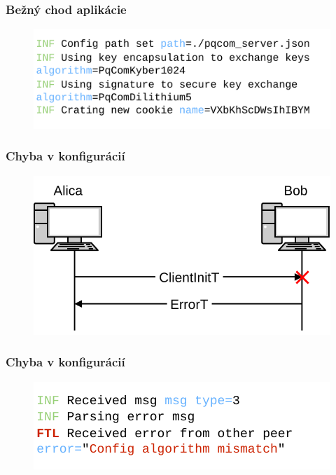 \documentclass[%
  14pt,       				%
	t,                  %
	aspectratio=1610,   %
	unicode,						%
]{beamer}				    	%
\begin{document}
\begin{frame}[c]
	\frametitle{Bežný chod aplikácie}
	\begin{figure}
		\includegraphics[width=\textwidth]{presentation_pictures/normal_comm.pdf}
	\end{figure}
\end{frame}

\begin{frame}[c]
	\frametitle{Chyba v konfigurácií}
	\begin{figure}
		\includegraphics[width=.9\textwidth]{presentation_pictures/comm_err.pdf}
	\end{figure}
\end{frame}

\begin{frame}[c]
	\frametitle{Chyba v konfigurácií}
	\begin{figure}[htbp]
		\centering
		\includegraphics[width=\textwidth]{presentation_pictures/client_err.pdf}
	\end{figure}
\end{frame}
\end{document}
